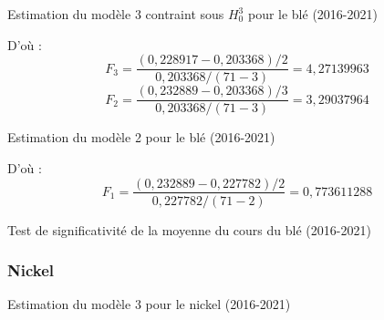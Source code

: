 \documentclass[12pt,a4paper]{article}
\begin{document}
\begin{table}[H]
    \centering
    \caption{Estimation du modèle 3 contraint sous $H_{0}^{3}$ pour le blé (2016-2021)}
    \label{tab:mod3cont_ble21}
    \sffamily
    \resizebox{0.8\textwidth}{!}{}
\end{table}
D'où : 
\begin{equation*}
    F_{3} = \frac{(0,228917 -  0,203368)/2}{0,203368/(71-3)} = 4,27139963
\end{equation*}
\begin{equation*}
    F_{2} = \frac{(0,232889 -  0,203368)/3}{0,203368/(71-3)} = 3,29037964
\end{equation*}
\begin{table}[H]
    \centering
    \caption{Estimation du modèle 2 pour le blé (2016-2021)}
    \label{tab:mod2_ble21}
    \sffamily
    \resizebox{0.8\textwidth}{!}{}
\end{table}
D'où : 
\begin{equation*}
    F_{1} = \frac{(0,232889 -  0,227782)/2}{0,227782 /(71-2)} = 0,773611288
\end{equation*}
\begin{table}[H]
    \centering
    \caption{Test de significativité de la moyenne du cours du blé (2016-2021)}
    \label{tab:testmoy_ble21}
    \sffamily
    \resizebox{0.6\textwidth}{!}{}
\end{table}

\subsubsection*{Nickel}
\begin{table}[H]
    \centering
    \caption{Estimation du modèle 3 pour le nickel (2016-2021)}
    \label{tab:mod3_nickel21}
    \sffamily
    \resizebox{0.8\textwidth}{!}{}
\end{table}
\end{document}
